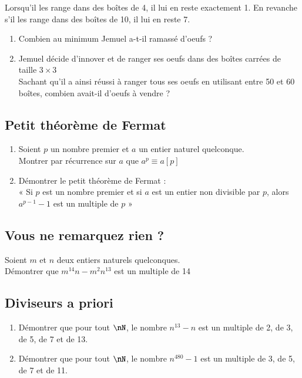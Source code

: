 \documentclass[oneside,12pt]{article}          %
\begin{document}
Lorsqu'il les range dans des boîtes de 4, il lui en reste exactement 1. En revanche s'il les range dans des boîtes de 10, il lui en reste 7.
\begin{enumerate}
    \item Combien au minimum Jemuel a-t-il ramassé d'oeufs ?
    \item Jemuel décide d'innover et de ranger ses oeufs dans des boîtes carrées de taille $3\times3$\\
    Sachant qu'il a ainsi réussi à ranger tous ses oeufs en utilisant entre 50 et 60 boîtes, combien avait-il d'oeufs à vendre ?
\end{enumerate}



\subsection{Petit théorème de Fermat}
\begin{enumerate}
    \item Soient $p$ un nombre premier et $a$ un entier naturel quelconque.\\
    Montrer par récurrence sur $a$ que $a^p\equiv a[p]$
    \item Démontrer le petit théorème de Fermat : \\
    « Si $p$ est un nombre premier et si $a$ est un entier non divisible par $p$, alors $a^{p-1}-1$ est un multiple de $p$ »
\end{enumerate}



\subsection{Vous ne remarquez rien ?}
Soient $m$ et $n$ deux entiers naturels quelconques. \\
Démontrer que $m^{14} n - m^2 n^{13}$ est un multiple de 14



\subsection{Diviseurs a priori}
\begin{enumerate}
    \item Démontrer que pour tout $\nN$, le nombre $n^{13}-n$ est un multiple de 2, de 3, de 5, de 7 et de 13.
    \item Démontrer que pour tout $\nN$, le nombre $n^{480}-1$ est un multiple de 3, de 5, de 7 et de 11.
\end{enumerate}
\end{document}
